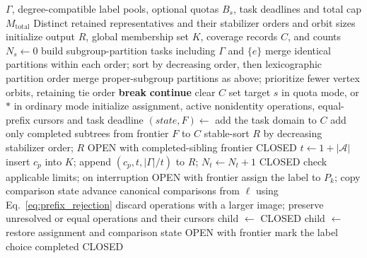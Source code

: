 \begin{algorithm}
\caption{Subgroup-Lattice Descent with Optional Exact-$\rho$ Quotas}
\label{alg:enum}
\scriptsize
\begin{algorithmic}[1]
\Require $\Gamma$, degree-compatible label pools, optional quotas $B_s$, task deadlines and total cap $M_{\mathrm{total}}$
\Ensure Distinct retained representatives and their stabilizer orders and orbit sizes
\State initialize output $R$, global membership set $K$, coverage records $C$, and counts $N_s\gets0$
\State build subgroup-partition tasks including $\Gamma$ and $\{e\}$
  \State merge identical partitions within each order; sort by decreasing order, then lexicographic partition order
\Else
  \State merge proper-subgroup partitions as above; prioritize fewer vertex orbits, retaining tie order
\EndIf
{}
   \State \textbf{break} \EndIf
   \State \textbf{continue} \EndIf
   \State clear $C$ \EndIf
  \State set target $s$ in quota mode, or $\ast$ in ordinary mode
  \State initialize assignment, active nonidentity operations, equal-prefix cursors and task deadline
  \State $(state,F)\gets$ 
    \State add the task domain to $C$
  \Else
    \State add only completed subtrees from frontier $F$ to $C$
  \EndIf
\EndFor
\State stable-sort $R$ by decreasing stabilizer order; \Return $R$
\Statex
{}
    \State \Return OPEN with completed-sibling frontier
  \EndIf
   \State \Return CLOSED \EndIf
    \State $t\gets1+|\mathcal A|$
      \State insert $c_p$ into $K$; append $(c_p,t,|\Gamma|/t)$ to $R$; $N_t\gets N_t+1$
    \EndIf
    \State \Return CLOSED
  \EndIf
    \State check applicable limits; on interruption \Return OPEN with frontier
    \State assign the label to $P_k$; copy comparison state
    \State advance canonical comparisons from $\boldsymbol\ell$ using Eq.~\ref{eq:prefix_rejection}
    \State discard operations with a larger image; preserve unresolved or equal operations and their cursors
     \State child $\gets$ CLOSED
    \Else \State child $\gets$  \EndIf
    \State restore assignment and comparison state
     \State \Return OPEN with frontier \EndIf
    \State mark the label choice completed
  \EndFor
  \State \Return CLOSED
\EndFunction
\end{algorithmic}
\end{algorithm}
